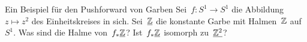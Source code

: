 \documentclass{uebblatt}
\begin{document}
\begin{aufgabe}{Ein Beispiel für den Pushforward von Garben}
Sei~$f : S^1 \to S^1$ die Abbildung~$z \mapsto z^2$ des Einheitskreises in
sich. Sei~$\underline{\mathbb{Z}}$ die konstante Garbe mit Halmen~$\mathbb{Z}$ auf~$S^1$. Was sind
die Halme von~$f_*\underline{\mathbb{Z}}$? Ist~$f_*\underline{\mathbb{Z}}$ isomorph zu~$\underline{\mathbb{Z}^2}$?
\end{aufgabe}
\end{document}
